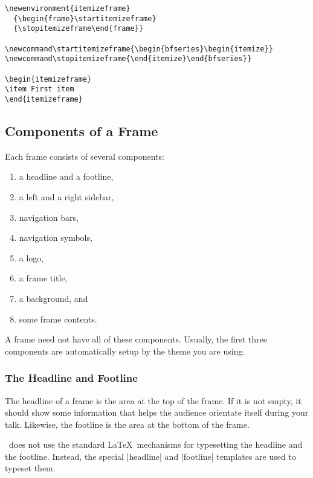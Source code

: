\begin{verbatim}
\newenvironment{itemizeframe}
  {\begin{frame}\startitemizeframe}
  {\stopitemizeframe\end{frame}}

\newcommand\startitemizeframe{\begin{bfseries}\begin{itemize}}
\newcommand\stopitemizeframe{\end{itemize}\end{bfseries}}

\begin{itemizeframe}
\item First item
\end{itemizeframe}
\end{verbatim}


\subsection{Components of a Frame}

Each frame consists of several components:
\begin{enumerate}\itemsep=0pt\parskip=0pt
\item a headline and a footline,
\item a left and a right sidebar,
\item navigation bars,
\item navigation symbols,
\item a logo,
\item a frame title,
\item a background, and
\item some frame contents.
\end{enumerate}

A frame need not have all of these components. Usually, the first three components are automatically setup by the theme you are using.

\subsubsection{The Headline and Footline}

The headline of a frame is the area at the top of the frame. If it is not empty, it should show some information that helps the audience orientate itself during your talk. Likewise, the footline is the area at the bottom of the frame.

\beamer\ does not use the standard \LaTeX\ mechanisms for typesetting the headline and the footline. Instead, the special |headline| and |footline| templates are used to typeset them.

